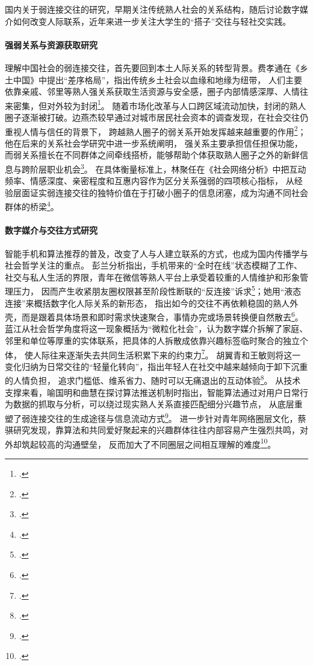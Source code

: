 国内关于弱连接交往的研究，早期关注传统熟人社会的关系结构，随后讨论数字媒介如何改变人际联系，近年来进一步关注大学生的“搭子”交往与轻社交实践。

\paragraph{强弱关系与资源获取研究}
理解中国社会的弱连接交往，首先要回到本土人际关系的转型背景。费孝通在《乡土中国》中提出“差序格局”，指出传统乡土社会以血缘和地缘为纽带，
人们主要依靠亲戚、邻里等熟人强关系获取生活资源与安全感，圈子内部情感深厚、人情往来密集，但对外较为封闭\footcite{Fei2012}。
随着市场化改革与人口跨区域流动加快，封闭的熟人圈子逐渐被打破。边燕杰较早通过对城市居民社会资本的调查发现，在社会交往仍重视人情与信任的背景下，
跨越熟人圈子的弱关系开始发挥越来越重要的作用\footcite{ZSHK200403011}；他在后来的关系社会学研究中进一步系统阐明，
强关系主要承担信任担保功能，而弱关系擅长在不同群体之间牵线搭桥，能够帮助个体获取熟人圈子之外的新鲜信息与跨阶层职业机会\footcite{Bian2021}。
在具体衡量标准上，林聚任在《社会网络分析》中把互动频率、情感深度、亲密程度和互惠内容作为区分关系强弱的四项核心指标，
从经验层面证实弱连接交往的独特价值在于打破小圈子的信息闭塞，成为沟通不同社会群体的桥梁\footcite{Lin2009}。

\paragraph{数字媒介与交往方式研究}
智能手机和算法推荐的普及，改变了人与人建立联系的方式，也成为国内传播学与社会哲学关注的重点。
彭兰分析指出，手机带来的“全时在线”状态模糊了工作、社交与私人生活的界限，青年在微信等熟人平台上承受着较重的人情维护和形象管理压力，
因而产生收紧朋友圈权限甚至阶段性断联的“反连接”诉求\footcite{GJXW201902002}；她用“液态连接”来概括数字化人际关系的新形态，
指出如今的交往不再依赖稳固的熟人外壳，而是跟着具体场景和即时需求快速聚合，事情办完或场景转换便自然散去\footcite{Peng2021}。
蓝江从社会哲学角度将这一现象概括为“微粒化社会”，认为数字媒介拆解了家庭、邻里和单位等厚重的实体联系，把具体的人拆散成依靠兴趣标签临时聚合的独立个体，
使人际往来逐渐失去共同生活积累下来的约束力\footcite{Lan2022}。
胡翼青和王敏则将这一变化归纳为日常交往的“轻量化转向”，指出年轻人在社交中越来越倾向于卸下沉重的人情负担，
追求门槛低、维系省力、随时可以无痛退出的互动体验\footcite{Hu2019}。
从技术支撑来看，喻国明和曲慧在探讨算法推送机制时指出，智能算法通过对用户日常行为数据的抓取与分析，可以绕过现实熟人关系直接匹配细分兴趣节点，
从底层重塑了弱连接交往的生成途径与信息流动方式\footcite{XJSF202001015}。
进一步针对青年网络圈层文化，蔡骐研究发现，靠算法和共同爱好聚起来的兴趣群体往往内部容易产生强烈共鸣，对外却筑起较高的沟通壁垒，
反而加大了不同圈层之间相互理解的难度\footcite{Cai2018}。

